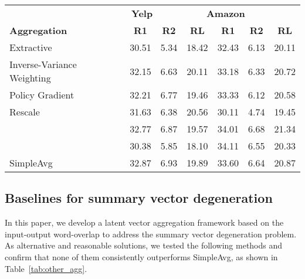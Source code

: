 \documentclass[11pt]{article}
\newcommand{\name}{\mbox{\sc BiMeanVAE}}
\newcommand{\simpleavg}{\mbox{SimpleAvg}}
\newcommand{\yelp}{\mbox{\bf Yelp}}
\newcommand{\amazon}{\mbox{\bf Amazon}}
\begin{document}
\begin{table*}[ht]
\centering
\begin{tabular}{llcccccc}\toprule
& \multicolumn{3}{c}{\yelp} & \multicolumn{3}{c}{\amazon} \\
\multicolumn{2}{l}{\textbf{Aggregation}} & \multicolumn{1}{c}{\bf R1} & \multicolumn{1}{c}{\bf R2}  &\multicolumn{1}{c}{\bf RL}  & \multicolumn{1}{c}{\bf R1} & \multicolumn{1}{c}{\bf R2}  &\multicolumn{1}{c}{\bf RL}   \\\midrule
\multicolumn{2}{l}{Extractive} & {\color{red} 30.51} & {\color{red}5.34} & {\color{red}18.42} & {\color{red}32.43} & {\color{red}6.13} & {\color{red}20.11} \\
\multicolumn{2}{l}{Inverse-Variance Weighting} & {\color{red}32.15} & {\color{red}6.63} & {\color{darkgreen} 20.11} & {\color{red}33.18} & {\color{red}6.33} & {\color{red}20.72} \\
\multicolumn{2}{l}{Policy Gradient} & {\color{red}32.21} & {\color{red}6.77} & {\color{red}19.46} & {\color{red}33.33} & {\color{red}6.12} & {\color{red}20.58}\\
Rescale &  &  {\color{red}31.63} &  {\color{red}6.38} &  {\color{darkgreen} 20.56} &  {\color{red} 30.11} & {\color{red} 4.74} &  {\color{red} 19.45} \\
&   &  {\color{red} 32.77} & {\color{red} 6.87} &  {\color{red}19.57} &  {\color{darkgreen} 34.01} & {\color{darkgreen}  6.68} &  {\color{darkgreen} 21.34} \\
&  &  {\color{red} 30.38} &  {\color{red} 5.85} &  {\color{red} 18.10} &  {\color{darkgreen} 34.11} &  {\color{red} 6.55} &  {\color{red}20.33} \\\midrule
\multicolumn{2}{l}{SimpleAvg} & 32.87 &  6.93 &  19.89 & 33.60 & 6.64 &  20.87 \\\bottomrule
\end{tabular}
\caption{ROUGE scores of \name{}, coupled with different input aggregation methods.
}\label{tab:other_agg}
\end{table*}

\subsection{Baselines for summary vector degeneration}

In this paper, we develop a latent vector aggregation framework based on the input-output word-overlap to address the summary vector degeneration problem. As alternative and reasonable solutions, we tested the following methods and confirm that none of them consistently outperforms \simpleavg, as shown in Table~\ref{tab:other_agg}.
\end{document}
